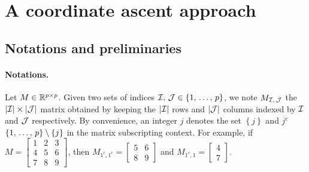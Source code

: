 \section{A coordinate ascent approach}\label{sec:coordinate_ascent}

\subsection{Notations and preliminaries}\label{subsec:notations_preliminaries}

\paragraph{Notations.}
Let $M \in \mathbb{R}^{p \times p}$.
Given two sets of indices $\mathcal{I},\,\mathcal{J} \in \left\{ 1,\, \dots,\, p \right\}$,
we note $M_{\mathcal{I},\,\mathcal{J}}$ the $\left\lvert\mathcal{I}\right\rvert \times \left\lvert\mathcal{J}\right\rvert$ matrix obtained by keeping
the $\left\lvert\mathcal{I}\right\rvert$ rows and $\left\lvert\mathcal{J}\right\rvert$ columns indexed by $\mathcal{I}$ and $\mathcal{J}$ respectively.
By convenience, an integer $j$ denotes the set $\left\{ j \right\}$ and $j^c$ $\left\{ 1,\, \dots,\, p \right\} \setminus \left\{ j \right\}$
in the matrix subscripting context.
For example, if $M = \begin{bmatrix}
    1 & 2 & 3\\
    4 & 5 & 6\\
    7 & 8 & 9
\end{bmatrix}$,
then $M_{1^c, 1^c} = \begin{bmatrix}
    5 & 6\\
    8 & 9
\end{bmatrix}$
and $M_{1^c, 1} = \begin{bmatrix}
    4\\
    7
\end{bmatrix}$.

